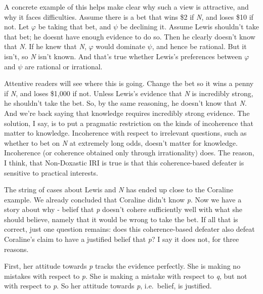 \documentclass[
  11pt,
  letterpaper,
  DIV=11,
  numbers=noendperiod,
  twoside]{scrartcl}
\begin{document}
A concrete example of this helps make clear why such a view is
attractive, and why it faces difficulties. Assume there is a bet that
wins \$2 if \emph{N}, and loses \$10 if not. Let \(\varphi\) be taking
that bet, and \(\psi\) be declining it. Assume Lewis shouldn't take that
bet; he doesnt have enough evidence to do so. Then he clearly doesn't
know that \emph{N}. If he knew that \emph{N}, \(\varphi\) would dominate
\(\psi\), and hence be rational. But it isn't, so \emph{N} isn't known.
And that's true whether Lewis's preferences between \(\varphi\) and
\(\psi\) are rational or irrational.

Attentive readers will see where this is going. Change the bet so it
wins a penny if \emph{N}, and loses \$1,000 if not. Unless Lewis's
evidence that \emph{N} is incredibly strong, he shouldn't take the bet.
So, by the same reasoning, he doesn't know that \emph{N}. And we're back
saying that knowledge requires incredibly strong evidence. The solution,
I say, is to put a pragmatic restriction on the kinds of incoherence
that matter to knowledge. Incoherence with respect to irrelevant
questions, such as whether to bet on \emph{N} at extremely long odds,
doesn't matter for knowledge. Incoherence (or coherence obtained only
through irrationality) does. The reason, I think, that Non-Doxastic IRI
is true is that this coherence-based defeater is sensitive to practical
interests.

The string of cases about Lewis and \emph{N} has ended up close to the
Coraline example. We already concluded that Coraline didn't know
\emph{p}. Now we have a story about why - belief that \emph{p} doesn't
cohere sufficiently well with what she should believe, namely that it
would be wrong to take the bet. If all that is correct, just one
question remains: does this coherence-based defeater also defeat
Coraline's claim to have a justified belief that \emph{p}? I say it does
not, for three reasons.

First, her attitude towards \emph{p} tracks the evidence perfectly. She
is making no mistakes with respect to \emph{p}. She is making a mistake
with respect to \emph{q}, but not with respect to \emph{p}. So her
attitude towards \emph{p}, i.e.~belief, is justified.
\end{document}
